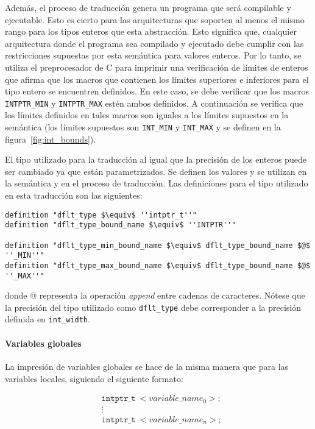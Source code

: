 Además, el proceso de traducción genera un programa que será compilable y ejecutable.
Esto es cierto para las arquitecturas que soporten al menos el mismo rango para los tipos enteros que esta abstracción.
Esto significa que, cualquier arquitectura donde el programa sea compilado y ejecutado debe cumplir con las restricciones supuestas por esta semántica para valores enteros.
Por lo tanto, se utiliza el preprocesador de C para imprimir una verificación de límites de enteros que afirma que los macros que contienen los límites superiores e inferiores para el tipo entero se encuentren definidos.
En este caso, se debe verificar que los macros \verb|INTPTR_MIN| y \verb|INTPTR_MAX| estén ambos definidos.
A continuación se verifica que los límites definidos en tales macros son iguales a los límites supuestos en la semántica (los límites supuestos son \verb|INT_MIN| y \verb|INT_MAX| y se definen en la figura~\ref{fig:int_bounds}).


El tipo utilizado para la traducción al igual que la precisión de los enteros puede ser cambiado ya que están parametrizados.
Se definen los valores y se utilizan en la semántica y en el proceso de traducción.
Las definiciones para el tipo utilizado en esta traducción son las siguientes:

\begin{lstlisting}[frame=single, mathescape=true]
definition "dflt_type $\equiv$ ''intptr_t''"
definition "dflt_type_bound_name $\equiv$ ''INTPTR''"

definition "dflt_type_min_bound_name $\equiv$ dflt_type_bound_name $@$ ''_MIN''"
definition "dflt_type_max_bound_name $\equiv$ dflt_type_bound_name $@$ ''_MAX''"
\end{lstlisting}

donde $@$ representa la operación \textit{append} entre cadenas de caracteres.
Nótese que la precisión del tipo utilizado como \verb|dflt_type| debe corresponder a la precisión definida en \verb|int_width|.

\paragraph*{Variables globales}

La impresión de variables globales se hace de la misma manera que para las variables locales, siguiendo el siguiente formato:

\begin{equation*}
\begin{split}
& \mathtt{intptr\_t}\ <variable\_name_0>; \\
& \vdots \\
& \mathtt{intptr\_t}\ <variable\_name_n>; \\
\end{split}
\end{equation*}

